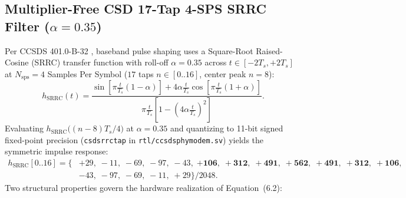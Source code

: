 \documentclass[10pt,a4paper]{article}
\renewcommand{\_}{\origunderscore\penalty0\hskip0pt\relax}
\numberwithin{equation}{section}
\numberwithin{table}{section}
\numberwithin{figure}{section}
\begin{document}
\subsection{Multiplier-Free CSD 17-Tap 4-SPS SRRC Filter ($\alpha = 0.35$)}
Per CCSDS 401.0-B-32 \cite{ccsds401}, baseband pulse shaping uses a Square-Root Raised-Cosine (SRRC) transfer function with roll-off $\alpha = 0.35$ across $t \in [-2T_s, +2T_s]$ at $N_{\text{sps}} = 4$ Samples Per Symbol ($17$ taps $n \in [0..16]$, center peak $n = 8$):
\begin{equation}
  h_{\text{SRRC}}(t) = \frac{\sin\!\left[\pi \frac{t}{T_s}(1-\alpha)\right] + 4\alpha \frac{t}{T_s}\cos\!\left[\pi \frac{t}{T_s}(1+\alpha)\right]}{\pi \frac{t}{T_s}\left[1 - \left(4\alpha \frac{t}{T_s}\right)^2\right]}.
\end{equation}
Evaluating $h_{\text{SRRC}}\big((n-8)T_s/4\big)$ at $\alpha = 0.35$ and quantizing to 11-bit signed fixed-point precision (\texttt{csd\_srrc\_tap} in \texttt{rtl/ccsds\_phy\_modem.sv}) yields the symmetric impulse response:
\begin{equation}
\begin{aligned}
  h_{\text{SRRC}}[0..16] = \Big\{&+29,\; -11,\; -69,\; -97,\; -43,\; \mathbf{+106,\; +312,\; +491,\; +562,\; +491,\; +312,\; +106}, \\
                                   &-43,\; -97,\; -69,\; -11,\; +29\Big\} / 2048.
\end{aligned}
\end{equation}
Two structural properties govern the hardware realization of Equation~(6.2):
\end{document}
